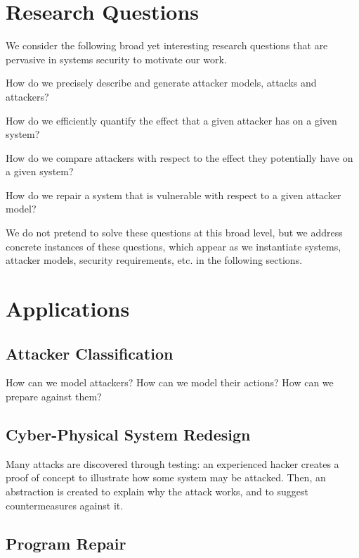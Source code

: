 \section{Research Questions}
We consider the following broad yet interesting research questions that are pervasive in systems security to motivate our work.
\begin{question}
\label{que:AttackerModel}
How do we precisely describe and generate attacker models, attacks and attackers?
\end{question}
\begin{question}
\label{que:Quantification}
How do we efficiently quantify the effect that a given attacker has on a given system? 
\end{question}
\begin{question}
\label{que:Classification}
How do we compare attackers with respect to the effect they potentially have on a given system?
\end{question}
\begin{question}
\label{que:Repair}
How do we repair a system that is vulnerable with respect to a given attacker model?
\end{question}
We do not pretend to solve these questions at this broad level, but we address concrete instances of these questions, which appear as we instantiate systems, attacker models, security requirements, etc. in the following sections.
\section{Applications}
\subsection{Attacker Classification}
How can we model attackers? How can we model their actions? How can we prepare against them?
\subsection{Cyber-Physical System Redesign}
Many attacks are discovered through testing: an experienced hacker creates a proof of concept to illustrate how some system may be attacked. Then, an abstraction is created to explain why the attack works, and to suggest countermeasures against it. 
\subsection{Program Repair}

